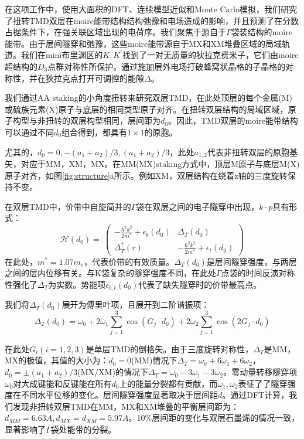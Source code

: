 \documentclass[reprint, aps, prb, showkeys]{revtex4-2}
\begin{document}
在这项工作中，使用大面积的DFT、连续模型近似和Monte Carlo模拟，我们研究了扭转TMD双层在moire能带结构结构弛豫和电场造成的影响，并且预测了在分数占据条件下，在强关联区域出现的电荷序。我们聚焦于源自于$\Gamma$袋装结构的moire能带。由于层间隧穿和弛豫，这些moire能带源自于MX和XM堆叠区域的局域轨道。我们在mini布里渊区的$K, K^{'}$找到了一对无质量的狄拉克费米子，它们由moire超结构的$D_3$点群对称性所保护。通过施加层外电场打破蜂窝状晶格的子晶格的对称性，并在狄拉克点打开可调控的能隙$\Delta$。

我们通过AA staking的小角度扭转来研究双层TMD，在此处顶层的每个金属(M)或硫族元素(X)原子与底层的相同类型原子对齐。在扭转双层结构的局域区域，原子构型与非扭转的双层构型相同，层间距为$d_0$。因此，TMD双层的moire能带结构可以通过不同$d_0$组合得到，都具有$1 \times 1$的原胞。

尤其的，$d_0 = 0, -(a_1 + a_2)/3, (a_1 + a_2)/3$，此处$a_{1,2}$代表非扭转双层的原胞基矢，对应于MM，XM，MX。在MM(MX)staking方式中，顶层M原子与底层M(X)原子对齐，如图\ref{fig:structure}a所示。例如XM，双层结构在绕着z轴的三度旋转保持不变。

在双层TMD中，价带中自旋简并的$\Gamma$袋在双层之间的电子隧穿中出现，$k \cdot p$具有形式：
\begin{equation}
    \mathcal{H}(d_0) = \
    \begin{pmatrix}
        -\frac{\hbar^2 k^2}{2m^{*}} + \epsilon_b(d_0)& \Delta_T(d_0) \\
        \Delta_T^{\dagger}(r)& -\frac{\hbar^2 k^2}{2m^{*}} + \epsilon_t(d_0)
    \end{pmatrix}
\end{equation}
在此处，$m^* = 1.07 m_e$，代表价带的有效质量。$\Delta_T(d_0)$是层间隧穿强度，与两层之间的层内位移有关。与K袋复杂的隧穿强度不同，在此处$\Gamma$点袋的时间反演对称性强化了$\Delta_T$为实数。势能项$\epsilon_{b,t}(d_0)$代表了缺失隧穿时的价带最高点。

我们将$\Delta_T(d_0)$展开为傅里叶项，且展开到二阶谐振项：
\begin{equation}
    \Delta_T(d_0) = \omega_0 + 2\omega_1 \sum_{j = 1}^3 \cos (G_j \cdot d_0) + 2\omega_2 \sum_{j = 1}^3 \cos (2G_j \cdot d_0) \label{eqn:expansion}
\end{equation}

在此处$G_i(i = 1, 2, 3)$是单层TMD的倒格矢。由于三度旋转对称性，$\Delta_T$是MM，MX的极值，其值的大小为：$d_0 = 0$(MM)情况下$\Delta_T = \omega_0 + 6\omega_1 + 6\omega_2$，$d_0 = \pm (a_1 + a_2)/3$(MX/XM)的情况下$\Delta_T = \omega_0 - 3\omega_1 - 3\omega_2$。零动量转移隧穿项$\omega_0$对大成键能和反键能在所有$d_0$上的能量分裂都有贡献，而$\omega_1, \omega_2$表征了了隧穿强度在不同水平位移的变化。层间隧穿强度显著取决于层间距$d$。通过DFT计算，我们发现非扭转双层TMD在MM，MX和XM堆叠的平衡层间距为：$d_{MM} = 6.63 A, d_{MX} = d _{XM} = 5.97 A$。10\%层间距的变化与双层石墨烯的情况一致，显著影响了$\Gamma$袋处能带的分裂。
\end{document}

